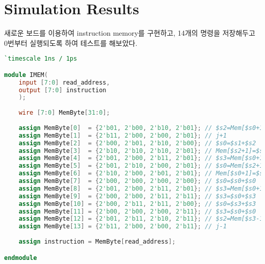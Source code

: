 \documentclass[10pt]{article}
\begin{document}
    \section{Simulation Results}
    새로운 보드를 이용하여 instruction memory를 구현하고, 14개의 명령을 저장해두고 0번부터 실행되도록 하여 테스트를 해보았다.
    \begin{lstlisting}[language=Verilog, caption=IMEM.v]
`timescale 1ns / 1ps

module IMEM(
    input [7:0] read_address,
	output [7:0] instruction
	);
	
	wire [7:0] MemByte[31:0];
	
	assign MemByte[0]  = {2'b01, 2'b00, 2'b10, 2'b01}; // $s2=Mem[$s0+1] / 1  = 01 / $s2 <= 1
	assign MemByte[1]  = {2'b11, 2'b00, 2'b00, 2'b01}; // j+1            / 0  = 00 / PC <= PC + 1
	assign MemByte[2]  = {2'b00, 2'b01, 2'b10, 2'b00}; // $s0=$s1+$s2    / X
	assign MemByte[3]  = {2'b10, 2'b10, 2'b10, 2'b01}; // Mem[$s2+1]=$s2 / 2  = 02 / Mem[2] <= 1
	assign MemByte[4]  = {2'b01, 2'b00, 2'b11, 2'b01}; // $s3=Mem[$s0+1] / 1  = 01 / $s3 <= 1
	assign MemByte[5]  = {2'b01, 2'b10, 2'b00, 2'b01}; // $s0=Mem[$s2+1] / 1  = 01 / $s0 <= 1
	assign MemByte[6]  = {2'b10, 2'b00, 2'b01, 2'b01}; // Mem[$s0+1]=$s1 / 2  = 02 / Mem[2] <= 0
	assign MemByte[7]  = {2'b00, 2'b00, 2'b00, 2'b00}; // $s0=$s0+$s0    / 2  = 02 / $s0 <= 2
	assign MemByte[8]  = {2'b01, 2'b00, 2'b11, 2'b01}; // $s3=Mem[$s0+1] / 3  = 03 / $s3 <= 3
	assign MemByte[9]  = {2'b00, 2'b00, 2'b11, 2'b11}; // $s3=$s0+$s3    / 5  = 05 / $s3 <= 5
	assign MemByte[10] = {2'b00, 2'b11, 2'b11, 2'b00}; // $s0=$s3+$s3    / 10 = 0A / $s0 <= 10
	assign MemByte[11] = {2'b00, 2'b00, 2'b00, 2'b11}; // $s3=$s0+$s0    / 20 = 14 / $s3 <= 20
	assign MemByte[12] = {2'b01, 2'b11, 2'b10, 2'b11}; // $s2=Mem[$s3-1] / -3 = FD / $s2 <= 11111101
	assign MemByte[13] = {2'b11, 2'b00, 2'b00, 2'b11}; // j-1            / 20 = 14 / PC <= PC - 1
	
	assign instruction = MemByte[read_address];

endmodule
    \end{lstlisting}
    
\end{document}
